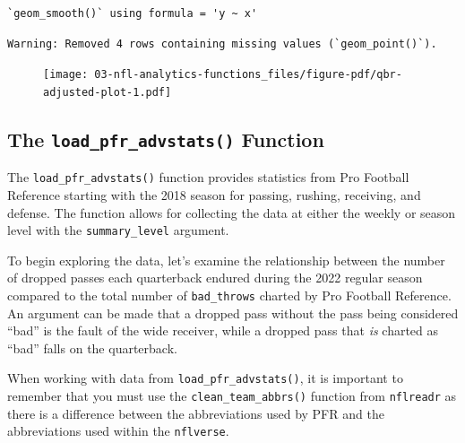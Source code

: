 \documentclass[
  letterpaper,
]{krantz}
\begin{document}
\begin{verbatim}
`geom_smooth()` using formula = 'y ~ x'
\end{verbatim}

\begin{verbatim}
Warning: Removed 4 rows containing missing values (`geom_point()`).
\end{verbatim}

\begin{figure}[H]

{\centering \texttt{[image: 03-nfl-analytics-functions\_files/figure-pdf/qbr-adjusted-plot-1.pdf]}

}

\end{figure}

\hypertarget{the-load_pfr_advstats-function}{%
\subsection{\texorpdfstring{The \texttt{load\_pfr\_advstats()}
Function}{The load\_pfr\_advstats() Function}}\label{the-load_pfr_advstats-function}}

The \texttt{load\_pfr\_advstats()} function provides statistics from Pro
Football Reference starting with the 2018 season for passing, rushing,
receiving, and defense. The function allows for collecting the data at
either the weekly or season level with the \texttt{summary\_level}
argument.

To begin exploring the data, let's examine the relationship between the
number of dropped passes each quarterback endured during the 2022
regular season compared to the total number of \texttt{bad\_throws}
charted by Pro Football Reference. An argument can be made that a
dropped pass without the pass being considered ``bad'' is the fault of
the wide receiver, while a dropped pass that \emph{is} charted as
``bad'' falls on the quarterback.

\begin{tcolorbox}[enhanced jigsaw, left=2mm, toprule=.15mm, opacitybacktitle=0.6, leftrule=.75mm, bottomrule=.15mm, colbacktitle=quarto-callout-important-color!10!white, breakable, colback=white, bottomtitle=1mm, toptitle=1mm, title=\textcolor{quarto-callout-important-color}{\faExclamation}\hspace{0.5em}{Important}, coltitle=black, titlerule=0mm, arc=.35mm, opacityback=0, colframe=quarto-callout-important-color-frame, rightrule=.15mm]

When working with data from \texttt{load\_pfr\_advstats()}, it is
important to remember that you must use the
\texttt{clean\_team\_abbrs()} function from \texttt{nflreadr} as there
is a difference between the abbreviations used by PFR and the
abbreviations used within the \texttt{nflverse}.

\end{tcolorbox}
\end{document}
